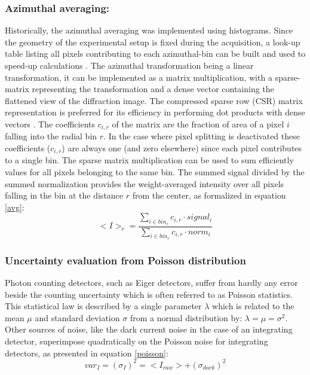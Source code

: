 \documentclass[preprint]{iucr}              %
\begin{document}
\subsubsection{Azimuthal averaging:} 

Historically, the azimuthal averaging was implemented using histograms.
Since the geometry of the experimental setup is fixed during the acquisition, a look-up table listing all pixels contributing to each  azimuthal-bin can be built and used to speed-up calculations \cite{pyFAI_gpu}.
The azimuthal transformation being a linear transformation, it can be implemented as a matrix multiplication, with a sparse-matrix representing the transformation and a dense vector containing the flattened view of the diffraction image. 
The compressed sparse row (CSR) matrix representation is preferred for its efficiency in performing dot products with dense vectors \cite{SpMV}.
The coefficients $c_{i,r}$ of the matrix are the fraction of area of a pixel $i$ falling into the radial bin $r$.
In the case where pixel splitting is deactivated these coefficients  ($c_{i,r}$) are always one (and zero elsewhere) since each pixel contributes to a single bin.
The sparse matrix multiplication can be used to sum efficiently values for all pixels belonging to the same bin.
The summed signal divided by the summed normalization provides the weight-averaged intensity over all pixels falling in the bin at the distance $r$ from the center, as formalized in equation \ref{avg}: 
\begin{equation}
\label{avg}
<I>_{r} = \frac{\sum\limits_{i \in bin_r} c_{i,r} \cdot signal_i}
                        {\sum\limits_{i \in bin_r} c_{i,r} \cdot norm_i} 
\end{equation}  

\subsubsection{Uncertainty evaluation from Poisson distribution}
Photon counting detectors, such as Eiger detectors, suffer from hardly any error beside the counting uncertainty which is often referred to as Poisson statistics.
This statistical law is described by a single parameter $\lambda$ which is related to the mean $\mu$ and standard deviation $\sigma$ from a normal distribution by: $\lambda=\mu=\sigma^2$.
Other sources of noise, like the dark current noise in the case of an integrating detector,  superimpose quadratically on the Poisson noise for integrating detectors, as presented in equation \ref{poisson}:     
\begin{equation}
\label{poisson}
var_I = (\sigma_I)^{2} = <I_{raw}> + (\sigma_{dark})^{2}  
\end{equation}
\end{document}
